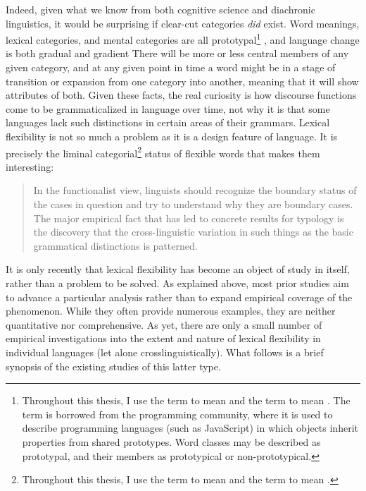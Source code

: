 Indeed, given what we know from both cognitive science and diachronic linguistics, it would be surprising if clear-cut categories \emph{did} exist. Word meanings, lexical categories, and mental categories are all prototypal\footnote{Throughout this thesis, I use the term  to mean  and the term  to mean . The term  is borrowed from the programming community, where it is used to describe programming languages (such as JavaScript) in which objects inherit properties from shared prototypes. Word classes may be described as prototypal, and their members as prototypical or non-prototypical.} \parencite{Taylor2003}, and language change is both gradual and gradient \parencites{HopperTraugott2003}{TraugottTrousdale2010} There will be more or less central members of any given category, and at any given point in time a word might be in a stage of transition or expansion from one category into another, meaning that it will show attributes of both. Given these facts, the real curiosity is how discourse functions come to be grammaticalized in language over time, not why it is that some languages lack such distinctions in certain areas of their grammars. Lexical flexibility is not so much a problem as it is a design feature of language. It is precisely the liminal categorial\footnote{Throughout this thesis, I use the term  to mean  and the term  to mean .} status of flexible words that makes them interesting:

\blockquote[{\cite[23]{Croft1991}}]{In the functionalist view, linguists should recognize the boundary status of the cases in question and try to understand why they are boundary cases. The major empirical fact that has led to concrete results for typology is the discovery that the cross-linguistic variation in such things as the basic grammatical distinctions is patterned.}

It is only recently that lexical flexibility has become an object of study in itself, rather than a problem to be solved. As explained above, most prior studies aim to advance a particular analysis rather than to expand empirical coverage of the phenomenon. While they often provide numerous examples, they are neither quantitative nor comprehensive. As yet, there are only a small number of empirical investigations into the extent and nature of lexical flexibility in individual languages (let alone crosslinguistically). What follows is a brief synopsis of the existing studies of this latter type.

